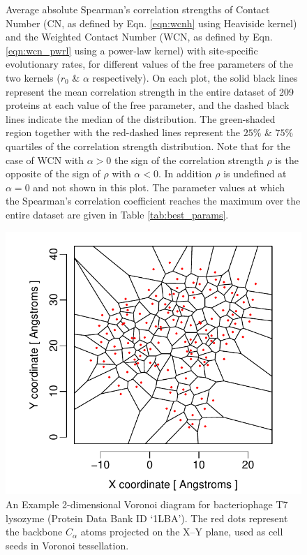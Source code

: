\documentclass[11pt]{article}
\begin{document}
\begin{figure}
        \caption{Average absolute Spearman's correlation strengths of Contact Number (CN, as defined by Eqn. \ref{eqn:wcnh} using Heaviside kernel) and the Weighted Contact Number (WCN, as defined by Eqn. \ref{eqn:wcn_pwrl} using a power-law kernel) with site-specific evolutionary rates, for different values of the free parameters of the two kernels ($r_0$ \& $\alpha$ respectively). On each plot, the solid black lines represent the mean correlation strength in the entire dataset of 209 proteins at each value of the free parameter, and the dashed black lines indicate the median of the distribution. The green-shaded region together with the red-dashed lines represent the $25\%$ \& $75\%$ quartiles of the correlation strength distribution. Note that for the case of WCN with $\alpha>0$ the sign of the correlation strength $\rho$ is the opposite of the sign of $\rho$ with $\alpha<0$. In addition $\rho$ is undefined at $\alpha=0$ and not shown in this plot.  The parameter values at which the Spearman's correlation coefficient reaches the maximum over the entire dataset are given in Table \ref{tab:best_params}.}
        \label{fig:cnwcnp}
    \end{figure}

    \begin{figure}
        \begin{center}
        \includegraphics[width=6in]{voronoi_diagram.pdf}
        \end{center}
        \caption{An Example 2-dimensional Voronoi diagram for bacteriophage T7 lysozyme (Protein Data Bank ID `1LBA'). The red dots represent the backbone $C_\alpha$ atoms projected on the X--Y plane, used as cell seeds in Voronoi tessellation.}
        \label{fig:voronoi}
    \end{figure}
\end{document}
